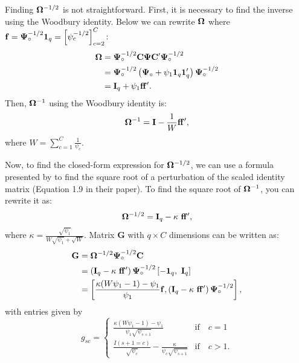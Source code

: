 Finding $\boldsymbol\Omega^{-1/2}$ is not straightforward. First, it is necessary to find the inverse using the Woodbury identity. Below we can rewrite $\boldsymbol\Omega$ where $\mathbf{f} = \boldsymbol\Psi_{\circ}^{-1/2} \mathbf{1}_q = \left[ \psi_c^{-1/2}\right]_{c = 2}^C$:
\begin{equation}
    \begin{aligned}
\boldsymbol\Omega &= \boldsymbol\Psi_{\circ}^{-1/2} \mathbf{C} \boldsymbol\Psi \mathbf{C}'\boldsymbol\Psi_{\circ}^{-1/2} \\
&= \boldsymbol\Psi_{\circ}^{-1/2} \left(\boldsymbol\Psi_{\circ} + \psi_1 \mathbf{1}_q \mathbf{1}_q'\right)\boldsymbol\Psi_{\circ}^{-1/2} \\
&= \mathbf{I}_q + \psi_1 \mathbf{f} \mathbf{f}'.
\end{aligned}
\nonumber
\end{equation}
Then, $\boldsymbol\Omega^{-1}$ using the Woodbury identity is: 
\begin{equation}
    \boldsymbol\Omega^{-1} = \mathbf{I} - \frac{1}{W} \mathbf{f} \mathbf{f}',
    \nonumber
\end{equation}
where $W = \sum_{c=1}^C \frac{1}{\psi_c}$.

Now, to find the closed-form expression for $\boldsymbol\Omega^{-1/2}$, we can use a formula presented by \textcite{fasi_computing_2023} to find the square root of a perturbation of the scaled identity matrix (Equation 1.9 in their paper). To find the square root of $\boldsymbol\Omega^{-1}$, you can rewrite it as:
\begin{equation}
    \bs\Omega^{-1/2} = \mathbf{I}_q - \kappa \ \bm{f} \bm{f}',
    \nonumber
\end{equation}
where $\kappa = \frac{\sqrt{\psi_1}}{W \sqrt{\psi_1} + \sqrt{W}}$.
Matrix $\bm{G}$ with $q \times C$ dimensions can be written as: 
\begin{equation}
    \begin{aligned}
\mathbf{G} &= \boldsymbol\Omega^{-1/2} \boldsymbol\Psi_{\circ}^{-1/2} \mathbf{C} \\
&= \left( \mathbf{I}_q - \kappa \ \mathbf{f} \mathbf{f}' \right) \boldsymbol\Psi_{\circ}^{-1/2} \left[-\mathbf{1}_q, \ \mathbf{I}_q \right] \\
&= \left[\frac{\kappa(W \psi_1 - 1) - \psi_1}{\psi_1} \mathbf{f},  \left( \mathbf{I}_q - \kappa \ \mathbf{f} \mathbf{f}' \right) \boldsymbol\Psi_{\circ}^{-1/2}\right],
\nonumber
\end{aligned}
\end{equation}
with entries given by 
\begin{equation}
    g_{sc} = \begin{cases}
\frac{\kappa(W \psi_1 - 1) - \psi_1}{\psi_1 \sqrt{\psi_{s+1}}} & \text{if} \quad c = 1 \\
\frac{I(s+1 = c)}{\sqrt{\psi_{c}}} - \frac{\kappa}{\psi_c \sqrt{\psi_{s+1}}} & \text{if} \quad c > 1.
\end{cases}
\nonumber
\end{equation}
   
